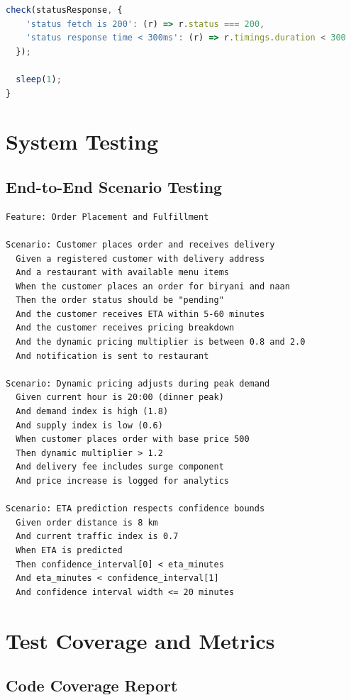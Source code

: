 \documentclass[12pt,a4paper]{report}
\begin{document}
\begin{itemize}
\begin{lstlisting}[language=javascript, caption={Load Test for API Throughput}]
  check(statusResponse, {
    'status fetch is 200': (r) => r.status === 200,
    'status response time < 300ms': (r) => r.timings.duration < 300
  });

  sleep(1);
}
\end{lstlisting}

\section{System Testing}

\subsection{End-to-End Scenario Testing}

\begin{lstlisting}[language=gherkin, caption={Behavior-Driven Testing (Cucumber/Gherkin)}]
Feature: Order Placement and Fulfillment

Scenario: Customer places order and receives delivery
  Given a registered customer with delivery address
  And a restaurant with available menu items
  When the customer places an order for biryani and naan
  Then the order status should be "pending"
  And the customer receives ETA within 5-60 minutes
  And the customer receives pricing breakdown
  And the dynamic pricing multiplier is between 0.8 and 2.0
  And notification is sent to restaurant

Scenario: Dynamic pricing adjusts during peak demand
  Given current hour is 20:00 (dinner peak)
  And demand index is high (1.8)
  And supply index is low (0.6)
  When customer places order with base price 500
  Then dynamic multiplier > 1.2
  And delivery fee includes surge component
  And price increase is logged for analytics

Scenario: ETA prediction respects confidence bounds
  Given order distance is 8 km
  And current traffic index is 0.7
  When ETA is predicted
  Then confidence_interval[0] < eta_minutes
  And eta_minutes < confidence_interval[1]
  And confidence interval width <= 20 minutes
\end{lstlisting}

\section{Test Coverage and Metrics}

\subsection{Code Coverage Report}


\end{itemize}
\end{document}
